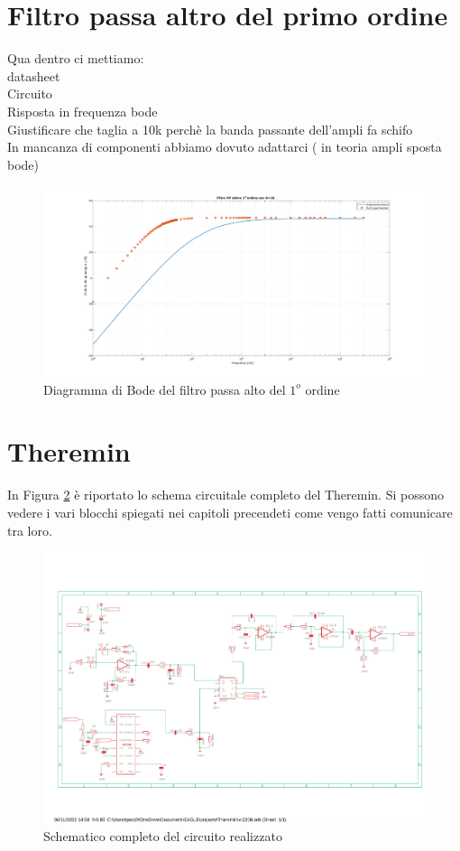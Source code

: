 \documentclass[titlepage]{report}
\begin{document}
\newpage
\section{Filtro passa altro del primo ordine}
	Qua dentro ci mettiamo: \\
	datasheet \\
	Circuito \\
	Risposta in frequenza bode \\
	Giustificare che taglia a 10k perchè la banda passante dell'ampli fa schifo \\

	In mancanza di componenti abbiamo dovuto adattarci
	( in teoria ampli sposta bode)

	\begin{figure}[H]
		\centering
		\includegraphics[scale=0.34]{Immagini/bode_hp1_ua741.pdf}
		\caption{Diagramma di Bode del filtro passa alto del $1^o$ ordine}
		\label{fig:BODEHp1Real}
	\end{figure}

\section{Theremin}
\label{ch:Teremin}
	In Figura \ref{fig:Schematico Completo} è riportato lo schema circuitale completo del Theremin. Si possono vedere i vari blocchi spiegati nei capitoli precendeti come vengo fatti comunicare tra loro.

	\begin{figure}[H]
		\centering
		\includegraphics[scale = 0.6]{Immagini/Schematico Completo.pdf}
		\caption{Schematico completo del circuito realizzato}
		\label{fig:Schematico Completo}
	\end{figure}
\end{document}

